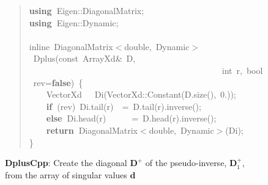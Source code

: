 \documentclass[shortnames,article]{jss}
\newcommand{\hlstd}[1]{\textcolor[rgb]{0,0,0}{#1}}
\newcommand{\hlnum}[1]{\textcolor[rgb]{0,0,0}{#1}}
\newcommand{\hlopt}[1]{\textcolor[rgb]{0,0,0}{#1}}
\newcommand{\hlkwa}[1]{\textcolor[rgb]{0.61,0.13,0.93}{\bf{#1}}}
\newcommand{\hlkwb}[1]{\textcolor[rgb]{0.13,0.54,0.13}{#1}}
\newcommand{\hlkwc}[1]{\textcolor[rgb]{0,0,1}{#1}}
\newcommand{\hlkwd}[1]{\textcolor[rgb]{0,0,0}{#1}}
\begin{document}
\begin{figure}[htb]
  \begin{quote}
    \noindent
    \ttfamily
    \hlstd{}\hlkwa{using\ }\hlstd{Eigen}\hlopt{::}\hlstd{DiagonalMatrix}\hlopt{;}\hspace*{\fill}\\
    \hlstd{}\hlkwa{using\ }\hlstd{Eigen}\hlopt{::}\hlstd{Dynamic}\hlopt{;}\hspace*{\fill}\\
    \hlstd{}\hspace*{\fill}\\
    \hlkwc{inline\ }\hlstd{DiagonalMatrix}\hlopt{$<$}\hlstd{}\hlkwb{double}\hlstd{}\hlopt{,\ }\hlstd{Dynamic}\hlopt{$>$\ }\hlstd{}\hlkwd{Dplus}\hlstd{}\hlopt{(}\hlstd{}\hlkwb{const\ }\hlstd{ArrayXd}\hlopt{\&\ }\hlstd{D}\hlopt{,}\hspace*{\fill}\\
    \hlstd{}\hlstd{\ \ \ \ \ \ \ \ \ \ \ \ \ \ \ \ \ \ \ \ \ \ \ \ \ \ \ \ \ \ \ \ \ \ \ \ \ \ \ \ \ \ \ \ \ }\hlstd{}\hlkwb{int\ }\hlstd{r}\hlopt{,\ }\hlstd{}\hlkwb{bool\ }\hlstd{rev}\hlopt{=}\hlstd{}\hlkwa{false}\hlstd{}\hlopt{)\ \{}\hspace*{\fill}\\
    \hlstd{}\hlstd{\ \ \ \ }\hlstd{VectorXd}\hlstd{\ \ \ }\hlstd{}\hlkwd{Di}\hlstd{}\hlopt{(}\hlstd{VectorXd}\hlopt{::}\hlstd{}\hlkwd{Constant}\hlstd{}\hlopt{(}\hlstd{D}\hlopt{.}\hlstd{}\hlkwd{size}\hlstd{}\hlopt{(),\ }\hlstd{}\hlnum{0}\hlstd{}\hlopt{.));}\hspace*{\fill}\\
    \hlstd{}\hlstd{\ \ \ \ }\hlstd{}\hlkwa{if\ }\hlstd{}\hlopt{(}\hlstd{rev}\hlopt{)\ }\hlstd{Di}\hlopt{.}\hlstd{}\hlkwd{tail}\hlstd{}\hlopt{(}\hlstd{r}\hlopt{)}\hlstd{\ \ }\hlopt{=\ }\hlstd{D}\hlopt{.}\hlstd{}\hlkwd{tail}\hlstd{}\hlopt{(}\hlstd{r}\hlopt{).}\hlstd{}\hlkwd{inverse}\hlstd{}\hlopt{();}\hspace*{\fill}\\
    \hlstd{}\hlstd{\ \ \ \ }\hlstd{}\hlkwa{else\ }\hlstd{Di}\hlopt{.}\hlstd{}\hlkwd{head}\hlstd{}\hlopt{(}\hlstd{r}\hlopt{)}\hlstd{\ \ \ \ \ \ }\hlopt{=\ }\hlstd{D}\hlopt{.}\hlstd{}\hlkwd{head}\hlstd{}\hlopt{(}\hlstd{r}\hlopt{).}\hlstd{}\hlkwd{inverse}\hlstd{}\hlopt{();}\hspace*{\fill}\\
    \hlstd{}\hlstd{\ \ \ \ }\hlstd{}\hlkwa{return\ }\hlstd{DiagonalMatrix}\hlopt{$<$}\hlstd{}\hlkwb{double}\hlstd{}\hlopt{,\ }\hlstd{Dynamic}\hlopt{$>$(}\hlstd{Di}\hlopt{);}\hspace*{\fill}\\
    \hlstd{}\hlopt{\}}\hlstd{}\hspace*{\fill}
    \normalfont
    \normalsize
  \end{quote}
  \caption{\textbf{DplusCpp}: Create the diagonal $\bm D^+$ of the
    pseudo-inverse, $\bm D_1^+$, from the array of singular values $\bm d$}
  \label{Dplus}
\end{figure}
\end{document}
